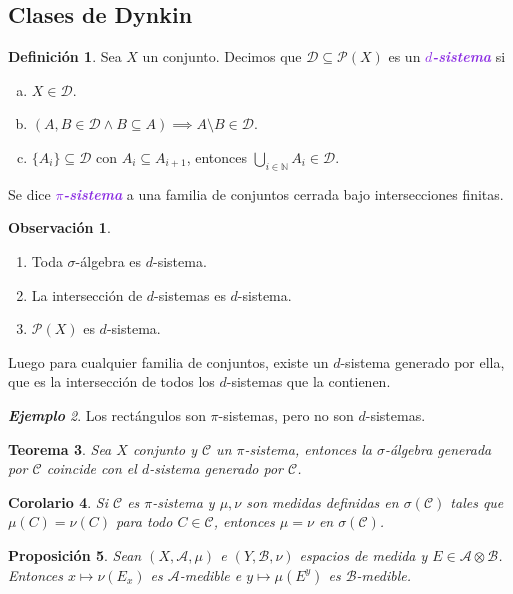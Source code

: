 \documentclass{article}
\newtheorem{theorem}{Teorema}[subsection]
\newtheorem{corollary}[theorem]{Corolario}
\newtheorem{proposition}[theorem]{Proposición}
\theoremstyle{definition}
\newtheorem{definition}[theorem]{Definición}
\newtheorem*{obs}{Observación}
\theoremstyle{remark}
\newtheorem{example}[theorem]{\textbf{Ejemplo}}
\numberwithin{equation}{section}
\newcommand{\A}{\mathcal{A}}
\newcommand{\B}{\mathcal{B}}
\newcommand{\N}{\mathbb{N}}
\renewcommand{\P}{\mathcal{P}}
\newcommand{\Ccal}{\mathcal{C}}
\newcommand{\Dcal}{\mathcal{D}}
\newcommand{\wea}[1]{\textcolor{BlueViolet}{\textbf{\emph{#1}}}}
\begin{document}
\newpage
\subsection{Clases de Dynkin}

\begin{definition}
  Sea $X$ un conjunto. Decimos que $\Dcal \subseteq \P(X)$ es un \wea{$d$-sistema} si
  \begin{enumerate}[(a)]
    \item $X \in \Dcal$.
    \item $(A,B \in \Dcal \land B \subseteq A) \implies A \setminus B \in \Dcal$.
    \item $\{A_i\} \subseteq \Dcal$ con $A_i \subseteq A_{i+1}$, entonces $\bigcup_{i\in\N} A_i \in \Dcal$.
  \end{enumerate} 
  Se dice \wea{$\pi$-sistema} a una familia de conjuntos cerrada bajo intersecciones finitas.
\end{definition}

\begin{obs}
  \
  \begin{enumerate}[(1)]
    \item Toda \( \sigma \)-álgebra es $d$-sistema.
    \item La intersección de $d$-sistemas es $d$-sistema.
    \item $\P(X)$ es $d$-sistema.
  \end{enumerate}
  Luego para cualquier familia de conjuntos, existe un $d$-sistema generado por ella, que es la intersección de todos los $d$-sistemas que la contienen.
\end{obs}

\begin{example}
  Los rectángulos son $\pi$-sistemas, pero no son $d$-sistemas.
\end{example}

\begin{theorem}
  Sea $X$ conjunto y $\Ccal$ un $\pi$-sistema, entonces la \( \sigma \)-álgebra generada por $\Ccal$ coincide con el $d$-sistema generado por $\Ccal$.
\end{theorem}

\begin{corollary}
  Si $\Ccal$ es $\pi$-sistema y $\mu,\nu$ son medidas definidas en $\sigma(\Ccal)$ tales que $\mu(C) = \nu(C)$ para todo $C \in \Ccal$, entonces $\mu = \nu$ en $\sigma(\Ccal)$.
\end{corollary}

\begin{proposition}
  Sean $(X,\A,\mu)$ e $(Y,\B,\nu)$ espacios de medida y $E \in \A \otimes \B$. Entonces $x \mapsto \nu(E_x)$ es $\A$-medible e $y \mapsto \mu(E^y)$ es $\B$-medible.
\end{proposition}
\end{document}
